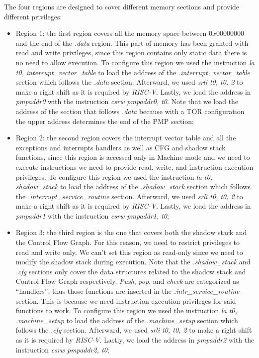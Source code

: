 The four regions are designed to cover different memory sections and provide different
privileges:
\begin{itemize}
  \item Region $1$: the first region covers all the memory space between
    $0x00000000$ and the end of the \textit{.data} region. This part of memory
    has been granted with read and write privileges, since this region contains only
    static data there is no need to allow execution. To configure this region we
    used the instruction \textit{la t0, interrupt\_vector\_table} to load the address
    of the \textit{.interrupt\_vector\_table} section which follows the \textit{.data}
    section. Afterward, we used \textit{srli t0, t0, 2} to make a right shift as
    it is required by \textit{RISC-V}. Lastly, we load the address in \textit{pmpaddr0}
    with the instruction \textit{csrw pmpaddr0, t0}. Note that we load the
    address of the section that follows \textit{.data} because with a TOR configuration
    the upper address determines the end of the PMP section;

  \item Region $2$: the second region covers the interrupt vector table and all
    the exceptions and interrupts handlers as well as CFG and shadow stack
    functions, since this region is accessed only in Machine mode and we need to
    execute instructions we need to provide read, write, and instruction execution
    privileges. To configure this region we used the instruction \textit{la t0, shadow\_stack}
    to load the address of the \textit{.shadow\_stack} section which follows the
    \textit{.interrupt\_service\_routine} section. Afterward, we used \textit{srli
    t0, t0, 2} to make a right shift as it is required by \textit{RISC-V}.
    Lastly, we load the address in \textit{pmpaddr1} with the instruction
    \textit{csrw pmpaddr1, t0};

  \item Region $3$: the third region is the one that covers both the shadow
    stack and the Control Flow Graph. For this reason, we need to restrict
    privileges to read and write only. We can't set this region as read-only since
    we need to modify the shadow stack during execution. Note that the \textit{.shadow\_stack}
    and \textit{.cfg} sections only cover the data structures related to the
    shadow stack and Control Flow Graph respectively. \textit{Push}, \textit{pop},
    and \textit{check} are categorized as ``handlers'', thus those functions are
    inserted in the \textit{.intr\_service\_routine} section. This is because we
    need instruction execution privileges for said functions to work. To
    configure this region we used the instruction \textit{la t0, .machine\_setup}
    to load the address of the \textit{.machine\_setup} section which follows
    the \textit{.cfg} section. Afterward, we used \textit{srli t0, t0, 2} to
    make a right shift as it is required by \textit{RISC-V}. Lastly, we load the
    address in \textit{pmpaddr2} with the instruction \textit{csrw pmpaddr2, t0};


\end{itemize}
